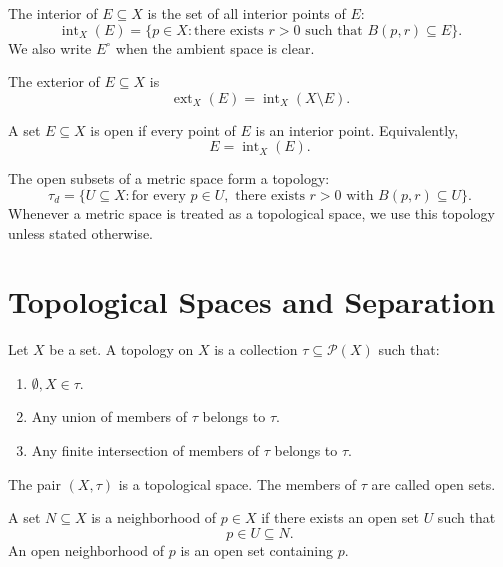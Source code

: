 \documentclass[answers,12pt,addpoints]{exam}
\begin{document}
\begin{definition}[Interior]
The interior of $E\subseteq X$ is the set of all interior
points of $E$:
\[
\operatorname{int}_X(E)
=
\{p\in X:\text{there exists }r>0
\text{ such that }B(p,r)\subseteq E\}.
\]
We also write $E^\circ$ when the ambient space is clear.
\end{definition}

\begin{definition}[Exterior]
The exterior of $E\subseteq X$ is
\[
\operatorname{ext}_X(E)
=
\operatorname{int}_X(X\setminus E).
\]
\end{definition}

\begin{definition}
A set $E\subseteq X$ is open if every point of $E$ is an
interior point. Equivalently,
\[
E=\operatorname{int}_X(E).
\]
\end{definition}

\begin{remark}
The open subsets of a metric space form a topology:
\[
\tau_d
=
\{U\subseteq X:
\text{for every }p\in U,\text{ there exists }r>0
\text{ with }B(p,r)\subseteq U\}.
\]
Whenever a metric space is treated as a topological space,
we use this topology unless stated otherwise.
\end{remark}

\section{Topological Spaces and Separation}

\begin{definition}
Let $X$ be a set. A topology on $X$ is a collection
$\tau\subseteq\mathcal{P}(X)$ such that:
\begin{enumerate}
    \item $\emptyset,X\in\tau$.
    \item Any union of members of $\tau$ belongs to $\tau$.
    \item Any finite intersection of members of $\tau$
    belongs to $\tau$.
\end{enumerate}
The pair $(X,\tau)$ is a topological space.
The members of $\tau$ are called open sets.
\end{definition}

\begin{definition}
A set $N\subseteq X$ is a neighborhood of $p\in X$ if there
exists an open set $U$ such that
\[
p\in U\subseteq N.
\]
An open neighborhood of $p$ is an open set containing $p$.
\end{definition}
\end{document}
